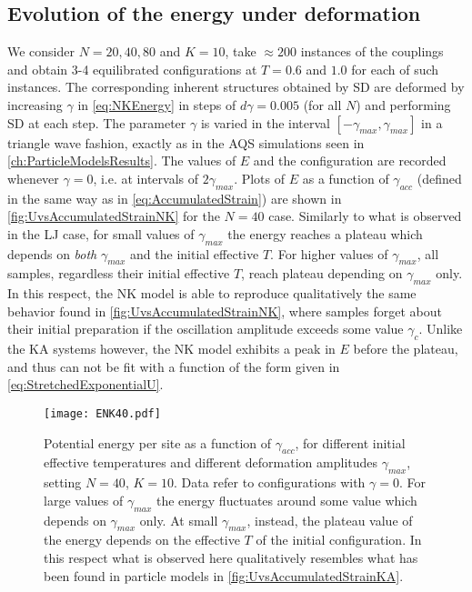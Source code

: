 \subsection{Evolution of the energy under deformation}
We consider $N = 20, 40, 80$ and $K=10$, take $\approx 200$ instances of the couplings and obtain 3-4 equilibrated configurations at $T = 0.6$ and $1.0$ for each of such instances. The corresponding inherent structures obtained by SD are deformed by increasing $\gamma$ in \autoref{eq:NKEnergy} in steps of $d\gamma = 0.005$ (for all $N$) and performing SD at each step. The parameter $\gamma$ is varied in the interval $[-\gamma_{max}, \gamma_{max}]$ in a triangle wave fashion, exactly as in the AQS simulations seen in \autoref{ch:ParticleModelsResults}. The values of $E$ and the configuration are recorded whenever $\gamma = 0$, i.e. at intervals of $2\gamma_{max}$. Plots of $E$ as a function of $\gamma_{acc}$ (defined in the same way as in \autoref{eq:AccumulatedStrain}) are shown in \autoref{fig:UvsAccumulatedStrainNK} for the $N = 40$ case. Similarly to what is observed in the LJ case, for small values of $\gamma_{max}$ the energy reaches a plateau which depends on \emph{both} $\gamma_{max}$ and the initial effective $T$. For higher values of $\gamma_{max}$, all samples, regardless their initial effective $T$, reach plateau depending on $\gamma_{max}$ only. In this respect, the NK model is able to reproduce qualitatively the same behavior found in \autoref{fig:UvsAccumulatedStrainNK}, where samples forget about their initial preparation if the oscillation amplitude exceeds some value $\gamma_{c}$. Unlike the KA systems however, the NK model exhibits a peak in $E$ before the plateau, and thus can not be fit with a function of the form given in \autoref{eq:StretchedExponentialU}.

\begin{figure}
\centering 
\texttt{[image: ENK40.pdf]} 
\caption{Potential energy per site as a function of $\gamma_{acc}$, for different initial effective temperatures and different deformation amplitudes $\gamma_{max}$, setting $N=40$, $K=10$. Data refer to configurations with $\gamma = 0$. For large values of $\gamma_{max}$ the energy fluctuates around some value which depends on $\gamma_{max}$ only. At small $\gamma_{max}$, instead, the plateau value of the energy depends on the effective $T$ of the initial configuration. In this respect what is observed here qualitatively resembles what has been found in particle models in \autoref{fig:UvsAccumulatedStrainKA}. \label{fig:UvsAccumulatedStrainNK}}
\end{figure}

